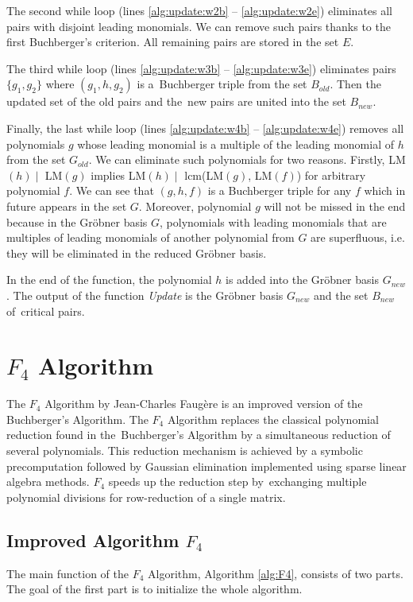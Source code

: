The second while loop (lines \ref{alg:update:w2b} -- \ref{alg:update:w2e}) eliminates all pairs with disjoint leading monomials. We can remove such pairs thanks to the first Buchberger's criterion. All remaining pairs are stored in the set $E$.

The third while loop (lines \ref{alg:update:w3b} -- \ref{alg:update:w3e}) eliminates pairs $\{g_1, g_2\}$ where $(g_1, h, g_2)$ is a~Buchberger triple from the set $B_{old}$. Then the updated set of the old pairs and the~new pairs are united into the set $B_{new}$.

Finally, the last while loop (lines \ref{alg:update:w4b} -- \ref{alg:update:w4e}) removes all polynomials $g$ whose leading monomial is a multiple of the leading monomial of $h$ from the set $G_{old}$. We can eliminate such polynomials for two reasons. Firstly, LM$(h) \mid$ LM$(g)$ implies LM$(h) \mid$ lcm(LM$(g)$, LM$(f)$) for arbitrary polynomial $f$. We can see that $(g, h, f)$ is a Buchberger triple for any $f$ which in future appears in the set $G$. Moreover, polynomial $g$ will not be missed in the end because in the Gr\"obner basis $G$, polynomials with leading monomials that are multiples of leading monomials of another polynomial from $G$ are superfluous, i.e. they will be eliminated in the reduced Gr\"obner basis.

In the end of the function, the polynomial $h$ is added into the Gr\"obner basis $G_{new}$. The output of the function \textit{Update} is the Gr\"obner basis $G_{new}$ and the set $B_{new}$ of~critical pairs.



\section{$F_4$ Algorithm}
\label{sec:F4}
The $F_4$ Algorithm \cite{F4} by Jean-Charles Faug\`ere is an improved version of the Buchberger's Algorithm. The $F_4$ Algorithm replaces the classical polynomial reduction found in the~Buchberger's Algorithm by a simultaneous reduction of several polynomials. This reduction mechanism is achieved by a symbolic precomputation followed by Gaussian elimination implemented using sparse linear algebra methods. $F_4$ speeds up the reduction step by~exchanging multiple polynomial divisions for row-reduction of a single matrix.

\subsection{Improved Algorithm $F_4$}
The main function of the $F_4$ Algorithm, Algorithm \ref{alg:F4}, consists of two parts. The goal of the first part is to initialize the whole algorithm.

